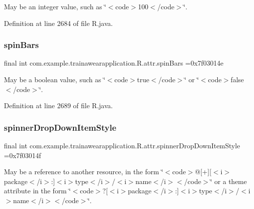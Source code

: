May be an integer value, such as \char`\"{}$<$code$>$100$<$/code$>$\char`\"{}. 

Definition at line 2684 of file R.\+java.

\mbox{\label{classcom_1_1example_1_1trainawearapplication_1_1_r_1_1attr_a710f7dc20900af8ff2c839707ea010c8}} 
\subsubsection{\texorpdfstring{spinBars}{spinBars}}
{\footnotesize\ttfamily final int com.\+example.\+trainawearapplication.\+R.\+attr.\+spin\+Bars =0x7f03014e\hspace{0.3cm}{\ttfamily [static]}}

May be a boolean value, such as \char`\"{}$<$code$>$true$<$/code$>$\char`\"{} or \char`\"{}$<$code$>$false$<$/code$>$\char`\"{}. 

Definition at line 2689 of file R.\+java.

\mbox{\label{classcom_1_1example_1_1trainawearapplication_1_1_r_1_1attr_a5f9b846cc3c89e55e3f48d919f1339b3}} 
\subsubsection{\texorpdfstring{spinnerDropDownItemStyle}{spinnerDropDownItemStyle}}
{\footnotesize\ttfamily final int com.\+example.\+trainawearapplication.\+R.\+attr.\+spinner\+Drop\+Down\+Item\+Style =0x7f03014f\hspace{0.3cm}{\ttfamily [static]}}

May be a reference to another resource, in the form \char`\"{}$<$code$>$@\mbox{[}+\mbox{]}\mbox{[}$<$i$>$package$<$/i$>$\+:\mbox{]}$<$i$>$type$<$/i$>$/$<$i$>$name$<$/i$>$$<$/code$>$\char`\"{} or a theme attribute in the form \char`\"{}$<$code$>$?\mbox{[}$<$i$>$package$<$/i$>$\+:\mbox{]}$<$i$>$type$<$/i$>$/$<$i$>$name$<$/i$>$$<$/code$>$\char`\"{}. 

